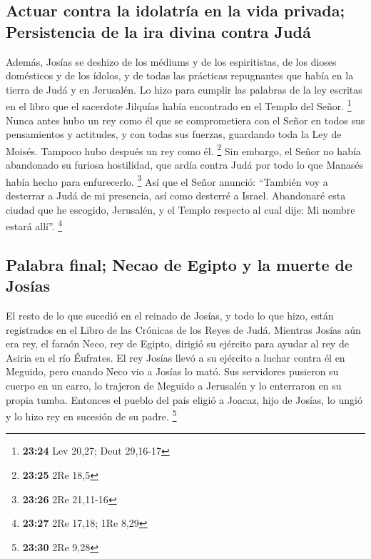 \hypertarget{actuar-contra-la-idolatruxeda-en-la-vida-privada-persistencia-de-la-ira-divina-contra-juduxe1}{%
\subsection{Actuar contra la idolatría en la vida privada; Persistencia
de la ira divina contra
Judá}\label{actuar-contra-la-idolatruxeda-en-la-vida-privada-persistencia-de-la-ira-divina-contra-juduxe1}}

 Además, Josías se deshizo de los médiums y de los
espiritistas, de los dioses domésticos y de los ídolos, y de todas las
prácticas repugnantes que había en la tierra de Judá y en Jerusalén. Lo
hizo para cumplir las palabras de la ley escritas en el libro que el
sacerdote Jilquías había encontrado en el Templo del Señor. \footnote{\textbf{23:24}
  Lev 20,27; Deut 29,16-17}  Nunca antes hubo un rey como
él que se comprometiera con el Señor en todos sus pensamientos y
actitudes, y con todas sus fuerzas, guardando toda la Ley de Moisés.
Tampoco hubo después un rey como él. \footnote{\textbf{23:25} 2Re 18,5}
 Sin embargo, el Señor no había abandonado su furiosa
hostilidad, que ardía contra Judá por todo lo que Manasés había hecho
para enfurecerlo. \footnote{\textbf{23:26} 2Re 21,11-16} 
Así que el Señor anunció: ``También voy a desterrar a Judá de mi
presencia, así como desterré a Israel. Abandonaré esta ciudad que he
escogido, Jerusalén, y el Templo respecto al cual dije: Mi nombre estará
allí''. \footnote{\textbf{23:27} 2Re 17,18; 1Re 8,29}

\hypertarget{palabra-final-necao-de-egipto-y-la-muerte-de-josuxedas}{%
\subsection{Palabra final; Necao de Egipto y la muerte de
Josías}\label{palabra-final-necao-de-egipto-y-la-muerte-de-josuxedas}}

 El resto de lo que sucedió en el reinado de Josías, y
todo lo que hizo, están registrados en el Libro de las Crónicas de los
Reyes de Judá.  Mientras Josías aún era rey, el faraón
Neco, rey de Egipto, dirigió su ejército para ayudar al rey de Asiria en
el río Éufrates. El rey Josías llevó a su ejército a luchar contra él en
Meguido, pero cuando Neco vio a Josías lo mató.  Sus
servidores pusieron su cuerpo en un carro, lo trajeron de Meguido a
Jerusalén y lo enterraron en su propia tumba. Entonces el pueblo del
país eligió a Joacaz, hijo de Josías, lo ungió y lo hizo rey en sucesión
de su padre. \footnote{\textbf{23:30} 2Re 9,28}

